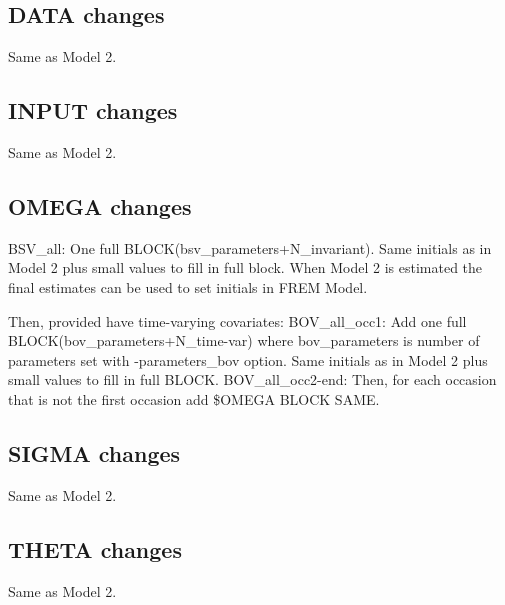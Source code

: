 \subsection{DATA changes}
Same as Model 2.
\subsection{INPUT changes}
Same as Model 2.

\subsection{OMEGA changes}
BSV\_all: One full BLOCK(bsv\_parameters+N\_invariant).
Same initials as in Model 2 plus small values to fill in full block. When Model 2 is estimated
the final estimates can be used to set initials in FREM Model.

Then, provided have time-varying covariates:
BOV\_all\_occ1: Add one full BLOCK(bov\_parameters+N\_time-var) where bov\_parameters is number of parameters set with -parameters\_bov option.
Same initials as in Model 2 plus small values to fill in full BLOCK.
BOV\_all\_occ2-end: Then, for each occasion that is not the first occasion add \$OMEGA BLOCK SAME.

\subsection{SIGMA changes}
Same as Model 2.

\subsection{THETA changes}
Same as Model 2.

